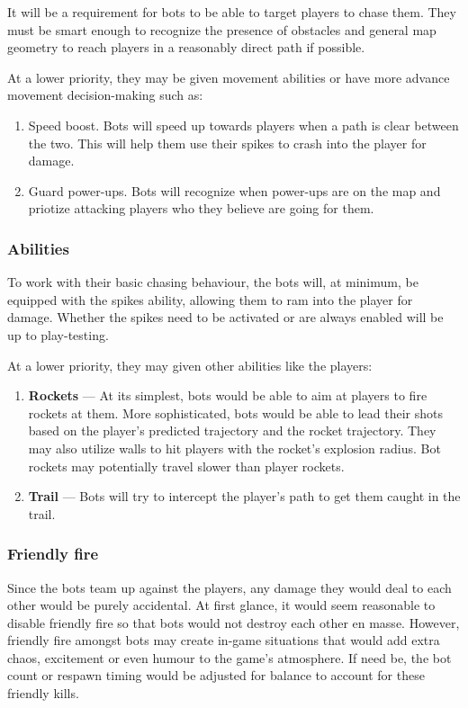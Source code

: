 \documentclass{article}
\theoremstyle{definition}
\begin{document}
It will be a requirement for bots to be able to target players to chase them.
They must be smart enough to recognize the presence of obstacles and general
map geometry to reach players in a reasonably direct path if possible.

At a lower priority, they may be given movement abilities or have more advance
movement decision-making such as:
\begin{enumerate}
  \item Speed boost. Bots will speed up towards players when a path is clear
    between the two. This will help them use their spikes to crash into the
    player for damage.
  \item Guard power-ups. Bots will recognize when power-ups are on the map and
    priotize attacking players who they believe are going for them.
\end{enumerate}

\subsubsection{Abilities}

To work with their basic chasing behaviour, the bots will, at minimum, be
equipped with the spikes ability, allowing them to ram into the player for
damage. Whether the spikes need to be activated or are always enabled will be
up to play-testing.

At a lower priority, they may given other abilities like the players:
\begin{enumerate}
  \item \textbf{Rockets} --- At its simplest, bots would be able to aim at
    players to fire rockets at them. More sophisticated, bots would be able to
    lead their shots based on the player's predicted trajectory and the rocket
    trajectory. They may also utilize walls to hit players with the rocket's
    explosion radius. Bot rockets may potentially travel slower than player
    rockets.
  \item \textbf{Trail} --- Bots will try to intercept the player's path to get
    them caught in the trail.
\end{enumerate}

\subsubsection{Friendly fire}

Since the bots team up against the players, any damage they would deal to each
other would be purely accidental. At first glance, it would seem reasonable to
disable friendly fire so that bots would not destroy each other en masse.
However, friendly fire amongst bots may create in-game situations that would
add extra chaos, excitement or even humour to the game's atmosphere. If need
be, the bot count or respawn timing would be adjusted for balance to account
for these friendly kills.
\end{document}
